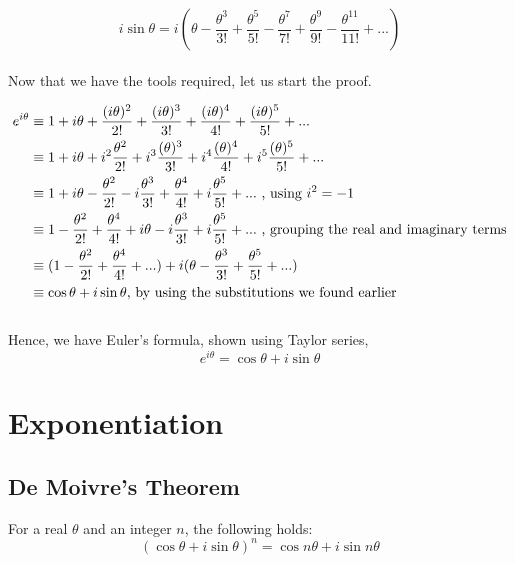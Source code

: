 \documentclass[a4paper,12pt,oneside]{book}
\begin{document}
$$i\sin \theta  = i(\theta  - \frac{\theta ^{3}}{3!} + \frac{\theta ^{5}}{5!} - \frac{\theta ^{7}}{7!} + \frac{\theta ^{9}}{9!} - \frac{\theta ^{11}}{11!} + ...)$$\\

Now that we have the tools required, let us start the proof.

\begin{align*}
e^{i\theta} &\equiv 1 + i\theta + \frac{(i\theta)^2}{2!} + \frac{(i\theta)^{3}}{3!} + \frac{(i\theta)^{4}}{4!} + \frac{(i\theta)^{5}}{5!} + ...\\
&\equiv 1 + i\theta + i^2\frac{\theta^2}{2!} + i^3\frac{(\theta)^3}{3!} +i^4\frac{(\theta)^4}{4!} +i^5\frac{(\theta)^5}{5!} + ...\\
&\equiv 1 + i\theta - \frac{\theta^2}{2!} - i\frac{\theta^3}{3!} + \frac{\theta^4}{4!} + i\frac{\theta^5}{5!}  +... \textnormal{ , using $i^2 = -1$}\\
&\equiv 1 - \frac{\theta^2}{2!}  + \frac{\theta^4}{4!} + i\theta - i\frac{\theta^3}{3!} + i\frac{\theta^5}{5!}  +... \textnormal{ , grouping the real and imaginary terms}\\
&\equiv (1 - \frac{\theta^2}{2!}  + \frac{\theta^4}{4!} + ... ) + i(\theta - \frac{\theta^3}{3!} + \frac{\theta^5}{5!} + ... )\\
&\equiv \cos\theta + i\sin\theta \textnormal{, by using the substitutions we found earlier}
\end{align*}\\

Hence, we have Euler's formula, shown using Taylor series,
$$e^{i\theta} = \cos\theta + i\sin\theta$$



\newpage
\chapter{Exponentiation}

\section{De Moivre's Theorem}
For a real $\theta$ and an integer $n$, the following holds:
$$(\cos\theta+i\sin\theta)^n = \cos n\theta+i\sin n \theta$$
\end{document}
